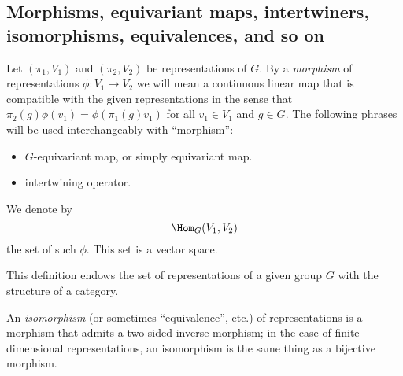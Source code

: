 \documentclass[reqno]{amsart} 
\begin{document}
\subsection{Morphisms, equivariant maps, intertwiners, isomorphisms, equivalences, and so on}

\begin{definition}
  Let $(\pi_1, V_1)$ and $(\pi_2, V_2)$ be representations of $G$.  By a \emph{morphism} of representations $\phi : V_1 \rightarrow V_2$ we will mean a continuous linear map that is compatible with the given representations in the sense that $\pi_2(g) \phi(v_1) = \phi(\pi_1(g) v_1)$ for all $v_1 \in V_1$ and $g \in G$.  The following phrases will be used interchangeably with ``morphism'':
  \begin{itemize}
  \item $G$-equivariant map, or simply equivariant map.
  \item intertwining operator.
  \end{itemize}
  We denote by
  \begin{equation*}
    \Hom_G(V_1,V_2)
  \end{equation*}
  the set of such $\phi$.  This set is a vector space.
  
  This definition endows the set of representations of a given group $G$ with the structure of a category.
  
  An \emph{isomorphism} (or sometimes ``equivalence'', etc.)  of representations is a morphism that admits a two-sided inverse morphism; in the case of finite-dimensional representations, an isomorphism is the same thing as a bijective morphism.
\end{definition}
\end{document}
